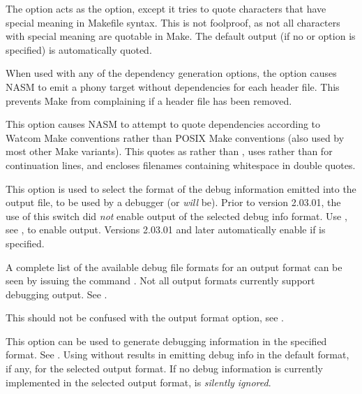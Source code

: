 
The  option acts as the  option, except
it tries to quote characters that have special meaning in Makefile
syntax. This is not foolproof, as not all characters with special
meaning are quotable in Make. The default output (if no  or
 option is specified) is automatically quoted.


When used with any of the dependency generation options, the
 option causes NASM to emit a phony target without
dependencies for each header file. This prevents Make from
complaining if a header file has been removed.


This option causes NASM to attempt to quote dependencies according to
Watcom Make conventions rather than POSIX Make conventions (also used
by most other Make variants). This quotes \code{\#} as \code{\$\#} rather
than \code{\textbackslash\#}, uses \code{\&} rather than \code{\textbackslash}
for continuation lines, and encloses filenames containing whitespace in
double quotes.


This option is used to select the format of the debug information
emitted into the output file, to be used by a debugger (or \emph{will}
be). Prior to version 2.03.01, the use of this switch did \emph{not}
enable output of the selected debug info format. Use ,
see , to enable output. Versions 2.03.01 and later
automatically enable  if  is specified.

A complete list of the available debug file formats for an output
format can be seen by issuing the command .
Not all output formats currently support debugging output.
See .

This should not be confused with the  output format option,
see .


This option can be used to generate debugging information in the specified
format. See . Using  without 
results in emitting debug info in the default format, if any, for the
selected output format. If no debug information is currently implemented
in the selected output format,  is \emph{silently ignored}.

